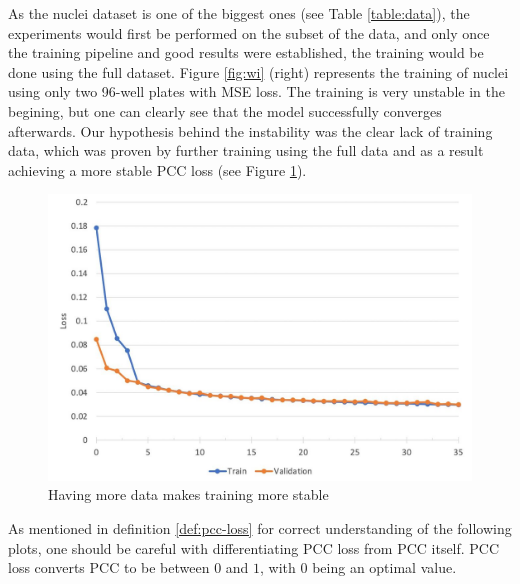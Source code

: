 

As the nuclei dataset is one of the biggest ones (see Table \ref{table:data}), the experiments would first be performed on the subset of the data, and only once the training pipeline and good results were established, the training would be done using the full dataset. Figure \ref{fig:wi} (right) represents the training of nuclei using only two 96-well plates with MSE loss. The training is very unstable in the begining, but one can clearly see that the model successfully converges afterwards. Our hypothesis behind the instability was the clear lack of training data, which was proven by further training using the full data and as a result achieving a more stable PCC loss (see Figure \ref{fig:full-dataset-pcc}).

\begin{figure}[H]
	\begin{center}
		\includegraphics[width=0.5\linewidth]{bilder/nuclei/full-dataset.jpg}
		\caption{Having more data makes training more stable}\label{fig:full-dataset-pcc}
	\end{center}
\end{figure}

As mentioned in definition \ref{def:pcc-loss} for correct understanding of the following plots, one should be careful with differentiating PCC loss from PCC itself. PCC loss converts PCC to be between $0$ and $1$, with $0$ being an optimal value.

